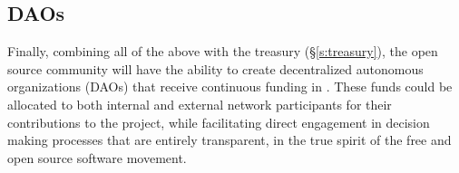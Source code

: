\subsection{DAOs}
Finally, combining all of the above with the \oscoin{} treasury
(\S\ref{s:treasury}), the open source community will have the ability to create
decentralized autonomous organizations (DAOs) that receive continuous funding
in \oscoin{}.  These funds could be allocated to both internal and external
network participants for their contributions to the project, while facilitating
direct engagement in decision making processes that are entirely transparent,
in the true spirit of the free and open source software movement.
